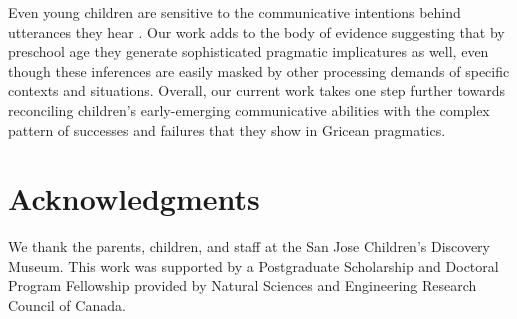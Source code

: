 \documentclass[10pt,letterpaper]{article}
\begin{document}
Even young children are sensitive to the communicative intentions behind utterances they hear \cite{clark2009first,baldwin1993early}. Our work adds to the body of evidence suggesting that by preschool age they generate sophisticated pragmatic implicatures as well, even though these inferences are easily masked by other processing demands of specific contexts and situations. Overall, our current work takes one step further towards reconciling children's early-emerging communicative abilities with the complex pattern of successes and failures that they show in Gricean pragmatics.

\section{Acknowledgments}

We thank the parents, children, and staff at the San Jose Children's Discovery Museum. This work was supported by a Postgraduate Scholarship and Doctoral Program Fellowship provided by Natural Sciences and Engineering Research Council of Canada.



\setlength{\bibleftmargin}{.125in}
\setlength{\bibindent}{-\bibleftmargin}


\end{document}
